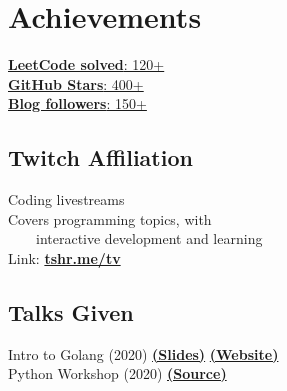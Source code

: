 \documentclass[]{resume}
\begin{document}
\begin{minipage}[t]{0.35\textwidth} 



\section{Achievements}
\vspace{4pt}

\href{https://leetcode.com/tusharsadhwani/}{\textbf{LeetCode solved}: 120+} \\
\href{https://github.com/tusharsadhwani}{\textbf{GitHub Stars}: 400+} \\
\href{https://dev.to/tusharsadhwani}{\textbf{Blog followers}: 150+} \\
\vspace{8pt}

\subsection{Twitch Affiliation}
\vspace{4pt}
\textbullet{} Coding livestreams \\
\textbullet{} Covers programming topics, with \\
​                                                   %
~~~~interactive development and learning \\        %
\textbullet{} Link: \href{https://tshr.me/tv}{\textbf{tshr.me/tv}} \\
\vspace{8pt}

\subsection{Talks Given}
\vspace{4pt}
\textbullet{} Intro to Golang (2020) \href{https://bit.ly/intro-to-golang}{\textbf{(Slides)}} \href{https://www.2020twenty.net/indore/}{\textbf{(Website)}} \\
\textbullet{} Python Workshop (2020) \href{https://github.com/tusharsadhwani/intro-to-python}{\textbf{(Source)}}
\sectionsep
\sectionsep



\end{minipage}
\end{document}
